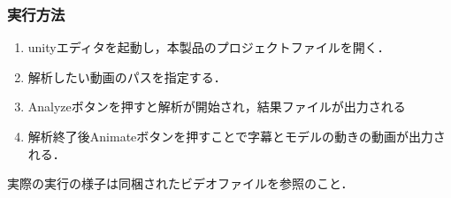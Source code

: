 \subsubsection{実行方法}
\begin{enumerate}
  \item unityエディタを起動し，本製品のプロジェクトファイルを開く．
  \item 解析したい動画のパスを指定する．
  \item Analyzeボタンを押すと解析が開始され，結果ファイルが出力される
  \item 解析終了後Animateボタンを押すことで字幕とモデルの動きの動画が出力される．
\end{enumerate}
実際の実行の様子は同梱されたビデオファイルを参照のこと．

